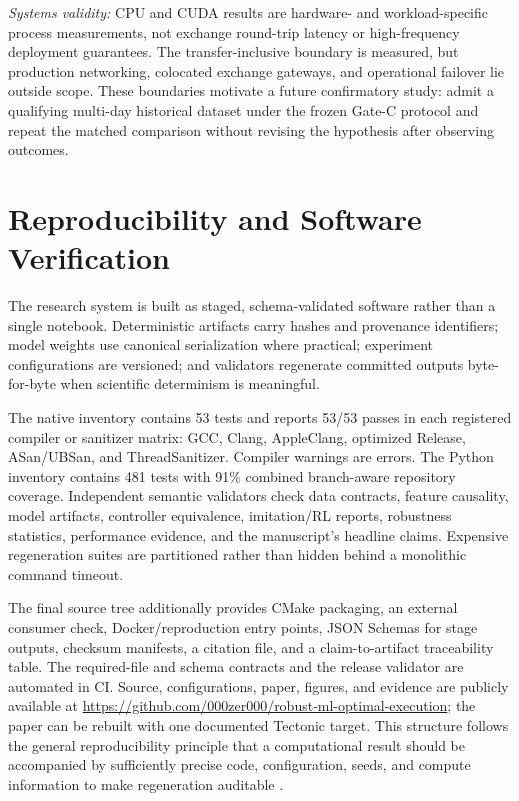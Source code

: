 \documentclass[journal,10pt]{IEEEtran}
\newcommand{\1}{\mathbf{1}}
\begin{document}
\textit{Systems validity:} CPU and CUDA results are hardware- and workload-specific process measurements, not exchange round-trip latency or high-frequency deployment guarantees. The transfer-inclusive boundary is measured, but production networking, colocated exchange gateways, and operational failover lie outside scope. These boundaries motivate a future confirmatory study: admit a qualifying multi-day historical dataset under the frozen Gate-C protocol and repeat the matched comparison without revising the hypothesis after observing outcomes.

\section{Reproducibility and Software Verification}
\label{sec:repro}
The research system is built as staged, schema-validated software rather than a single notebook. Deterministic artifacts carry hashes and provenance identifiers; model weights use canonical serialization where practical; experiment configurations are versioned; and validators regenerate committed outputs byte-for-byte when scientific determinism is meaningful.

The native inventory contains 53 tests and reports 53/53 passes in each registered compiler or sanitizer matrix: GCC, Clang, AppleClang, optimized Release, ASan/UBSan, and ThreadSanitizer. Compiler warnings are errors. The Python inventory contains 481 tests with 91\% combined branch-aware repository coverage. Independent semantic validators check data contracts, feature causality, model artifacts, controller equivalence, imitation/RL reports, robustness statistics, performance evidence, and the manuscript's headline claims. Expensive regeneration suites are partitioned rather than hidden behind a monolithic command timeout.

The final source tree additionally provides CMake packaging, an external consumer check, Docker/reproduction entry points, JSON Schemas for stage outputs, checksum manifests, a citation file, and a claim-to-artifact traceability table. The required-file and schema contracts and the release validator are automated in CI. Source, configurations, paper, figures, and evidence are publicly available at \url{https://github.com/000zer000/robust-ml-optimal-execution}; the paper can be rebuilt with one documented Tectonic target. This structure follows the general reproducibility principle that a computational result should be accompanied by sufficiently precise code, configuration, seeds, and compute information to make regeneration auditable \cite{PineauVincentLamarreSinhaLariviere2021}.
\end{document}

